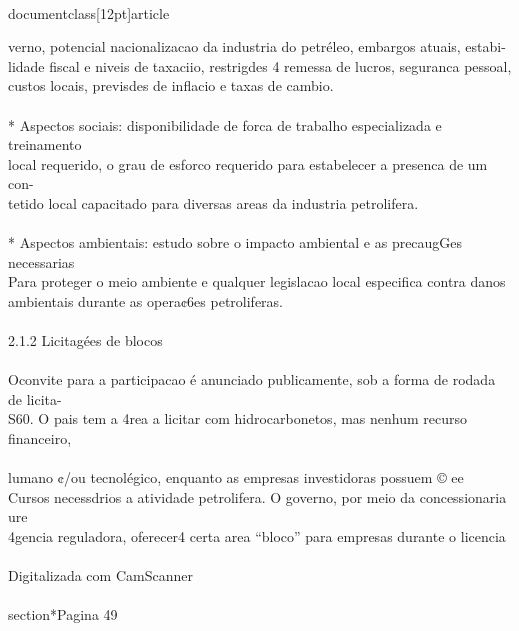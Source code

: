 \\documentclass[12pt]{article}
\begin{document}
verno, potencial nacionalizacao da industria do petréleo, embargos atuais, estabi-\\
lidade fiscal e niveis de taxaciio, restrigdes 4 remessa de lucros, seguranca pessoal,\\
custos locais, previsdes de inflacio e taxas de cambio.\\
\\
* Aspectos sociais: disponibilidade de forca de trabalho especializada e treinamento\\
local requerido, o grau de esforco requerido para estabelecer a presenca de um con-\\
tetido local capacitado para diversas areas da industria petrolifera.\\
\\
* Aspectos ambientais: estudo sobre o impacto ambiental e as precaugGes necessarias\\
Para proteger o meio ambiente e qualquer legislacao local especifica contra danos\\
ambientais durante as opera¢6es petroliferas.\\
\\
2.1.2 Licitagées de blocos\\
\\
Oconvite para a participacao é anunciado publicamente, sob a forma de rodada de licita-\\
S60. O pais tem a 4rea a licitar com hidrocarbonetos, mas nenhum recurso financeiro,\\
\\
lumano ¢/ou tecnolégico, enquanto as empresas investidoras possuem © ee\\
Cursos necessdrios a atividade petrolifera. O governo, por meio da concessionaria ure\\
4gencia reguladora, oferecer4 certa area “bloco” para empresas durante o licencia\\
\\
Digitalizada com CamScanner\\

\\section*{Pagina 49}
\end{document}
